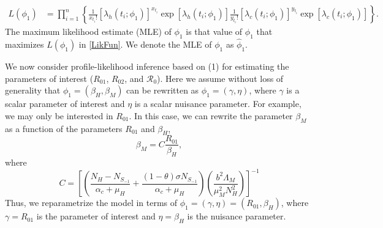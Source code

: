 \documentclass[draft, openbib]{imammb}
\numberwithin{equation}{section}
\begin{document}
    \begin{equation}
        \begin{split}
            L \left( \phi_{1} \right)
             &= \prod_{i = 1} ^ {n} 
             \left \{ 
                 \frac{1}{x_{t_i}!}
                     \left[\lambda_{h}
                         \left(t_{i};\phi_{1}\right)
                     \right] ^ {x_{t_i}} \exp
                     \left[
                         \lambda_{h} \left(t_{i}; \phi_{1} \right)
                     \right] 
             \right. 
            \left.
                 \frac{1}{y_{t_i}!}
                 \left[\lambda_{c}
                     \left(t_{i};\phi_{1}\right)
                 \right] ^ {y_{t_i}}
                 \exp
                 \left[
                     \lambda_{c}
                     \left(t_{i};\phi_{1}\right)
                 \right]
             \right\}.\label{LikFun}
        \end{split}
    \end{equation}
    The maximum likelihood estimate (MLE) of $\phi_{1}$ is that value 
    of $\phi_{1}$ that maximizes $L\left(\phi_{1}\right)$ in 
    \eqref{LikFun}. We denote the MLE of $\phi_{1}$ as $\hat{\phi}_{1}$.

        We now consider profile-likelihood inference based on (1) for
    estimating the parameters of interest ($R_{01}$, $R_{02}$, and
    $\mathcal{R}_{0}$). Here we assume without loss of generality that
    $\phi_{1}=\left(\beta_{H},\beta_{M}\right)$ can be rewritten as
    $\phi_{1}=\left(\gamma,\eta\right)$, where $\gamma$ is a scalar
    parameter of interest and $\eta$ is a scalar nuisance parameter. For
    example, we may only be interested in $R_{01}$. In this case, we can
    rewrite the parameter $\beta_{M}$ as a function of the parameters
    $R_{01}$ and $\beta_{H}$, 
    \begin{equation}
        \beta_{M}=C\frac{R_{01}}{\beta_{H}}, \nonumber
    \end{equation}
    where
    \begin{equation}
        C=\left[\left(\frac{N_H - N_{S_{-1}}}{\alpha_c + \mu_H}
            +\frac{(1- \theta ) \sigma N_{S_{-1}}}{ \alpha_c + \mu_H}\right)
            \left(\frac{b^2\Lambda_M}{\mu_M ^ 2  N_H ^ 2}\right)\right]^{-1} \nonumber
    \end{equation}
        Thus, we reparametrize the model in terms of 
    $\phi_{1}=\left(\gamma,\eta\right)=\left(R_{01},\beta_{H}\right)$, 
    where $\gamma=R_{01}$ is the parameter of interest and 
    $\eta=\beta_{H}$ is the nuisance parameter.
\end{document}
